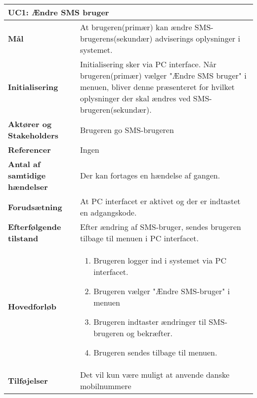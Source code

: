 \begin{table}[H] \centering
\begin{tabular}{|p{6cm}|p{8cm}|}
	\hline
\multicolumn{2}{|l|}{\textbf{UC1: Ændre SMS bruger}} \\\hline
\textbf{Mål}								&
At brugeren(primær) kan ændre SMS-brugerens(sekundær) adviserings oplysninger i systemet.
 \\\hline
\textbf{Initialisering}					&
Initialisering sker via PC interface. Når brugeren(primær) vælger "Ændre SMS bruger" i menuen, bliver denne præsenteret for hvilket oplysninger der skal ændres ved SMS-brugeren(sekundær).
 \\\hline
\textbf{Aktører og Stakeholders}			&
Brugeren go SMS-brugeren
 \\\hline
\textbf{Referencer}						&
Ingen
 \\\hline
\textbf{Antal af samtidige hændelser}	&
Der kan fortages en hændelse af gangen.
 \\\hline
\textbf{Forudsætning}					&
At PC interfacet er aktivet og der er indtastet en adgangskode.
 \\\hline
\textbf{Efterfølgende tilstand}			&
Efter ændring af SMS-bruger, sendes brugeren tilbage til menuen i PC interfacet.
 \\\hline
\textbf{Hovedforløb}						&
\begin{enumerate}
\item Brugeren logger ind i systemet via PC interfacet.
\item Brugeren vælger "Ændre SMS-bruger" i menuen
\item Brugeren indtaster ændringer til SMS-brugeren og bekræfter.
\item Brugeren sendes tilbage til menuen.
\end{enumerate}
 \\\hline
\textbf{Tilføjelser}						&
Det vil kun være muligt at anvende danske mobilnummere \\\hline
	\end{tabular}
	\label{UC7} 
\end{table}